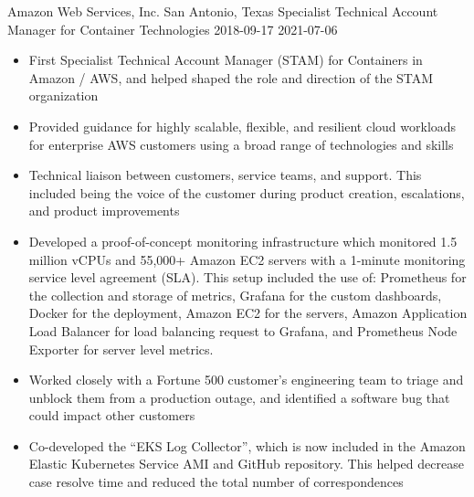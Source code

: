 \roleheader
    {Amazon Web Services, Inc.}
    {San Antonio, Texas}
    {Specialist Technical Account Manager for Container Technologies}
    {2018-09-17}
    {2021-07-06}
\begin{itemize}

    \item First Specialist Technical Account Manager (STAM) for Containers in Amazon / AWS, and helped shaped the role and direction of the STAM organization

    \item Provided guidance for highly scalable, flexible, and resilient cloud workloads for enterprise AWS customers using a broad range of technologies and skills

    \item Technical liaison between customers, service teams, and support. This included being the voice of the customer during product creation, escalations, and product improvements

    \item Developed a proof-of-concept monitoring infrastructure which monitored 1.5 million vCPUs and 55,000+ Amazon EC2 servers with a 1-minute monitoring service level agreement (SLA). This setup included the use of: Prometheus for the collection and storage of metrics, Grafana for the custom dashboards, Docker for the deployment, Amazon EC2 for the servers, Amazon Application Load Balancer for load balancing request to Grafana, and Prometheus Node Exporter for server level metrics.

    \item Worked closely with a Fortune 500 customer's engineering team to triage and unblock them from a production outage, and identified a software bug that could impact other customers

    \item Co-developed the ``EKS Log Collector'', which is now included in the Amazon Elastic Kubernetes Service AMI and GitHub repository. This helped decrease case resolve time and reduced the total number of correspondences

\end{itemize}